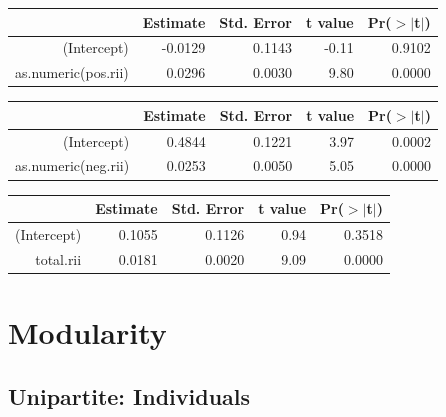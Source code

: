 \documentclass[12pt]{article}
\begin{document}
\begin{table}[ht]
\begin{center}
\begin{tabular}{rrrrr}
  \hline
 & Estimate & Std. Error & t value & Pr($>$$|$t$|$) \\ 
  \hline
(Intercept) & -0.0129 & 0.1143 & -0.11 & 0.9102 \\ 
  as.numeric(pos.rii) & 0.0296 & 0.0030 & 9.80 & 0.0000 \\ 
   \hline
\end{tabular}
\end{center}
\end{table}
\begin{table}[ht]
\begin{center}
\begin{tabular}{rrrrr}
  \hline
 & Estimate & Std. Error & t value & Pr($>$$|$t$|$) \\ 
  \hline
(Intercept) & 0.4844 & 0.1221 & 3.97 & 0.0002 \\ 
  as.numeric(neg.rii) & 0.0253 & 0.0050 & 5.05 & 0.0000 \\ 
   \hline
\end{tabular}
\end{center}
\end{table}
\begin{table}[ht]
\begin{center}
\begin{tabular}{rrrrr}
  \hline
 & Estimate & Std. Error & t value & Pr($>$$|$t$|$) \\ 
  \hline
(Intercept) & 0.1055 & 0.1126 & 0.94 & 0.3518 \\ 
  total.rii & 0.0181 & 0.0020 & 9.09 & 0.0000 \\ 
   \hline
\end{tabular}
\end{center}
\end{table}

\section{Modularity}
\subsection{Unipartite: Individuals}
\end{document}

